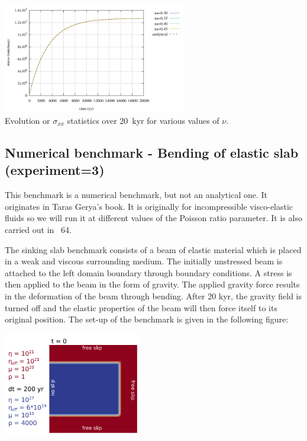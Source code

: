 \begin{center}
\includegraphics[width=8cm]{python_codes/fieldstone_129/results/experiment2/stats_stress}\\
{\captionfont Evolution or $\sigma_{xx}$ statistics over 20~kyr for various values of $\nu$.}
\end{center} 



\subsection*{Numerical benchmark - Bending of elastic slab (experiment=3)}

This benchmark is a numerical benchmark, but not an analytical one. 
It originates in Taras Gerya's book. It is originally for incompressible visco-elastic fluids so we will run it at different values of the Poisson ratio parameter.
It is also carried out in \stone~64.

The sinking slab benchmark consists of a beam of elastic material which is placed 
in a weak and viscous surrounding medium. The initially unstressed beam is attached 
to the left domain boundary through boundary conditions. A stress is then applied to  
the beam in the form of gravity. The applied gravity force results in the deformation 
of the beam through bending. After 20 kyr, the gravity field is turned off and the 
elastic properties of the beam will then force itself to its original position.  
The set-up of the benchmark is given in the following figure: 

\begin{center}
\includegraphics[width=6cm]{python_codes/fieldstone_64/images/poster_benchmark.png}\\
\end{center}

